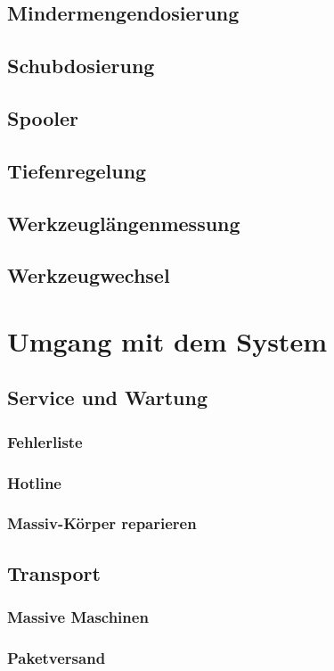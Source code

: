 \documentclass[14pt,a4paper]{book}
\begin{document}
	\section{Mindermengendosierung} 
	\section{Schubdosierung} 
	\section{Spooler} 
	\section{Tiefenregelung} 
	\section{Werkzeuglängenmessung} 
	\section{Werkzeugwechsel} 

\chapter{Umgang mit dem System}
	\section{Service und Wartung} 
		\subsection{Fehlerliste} 
		\subsection{Hotline} 
		\subsection{Massiv-Körper reparieren} 
	\section{Transport} 
		\subsection{Massive Maschinen} 
		\subsection{Paketversand} 
 
\end{document}
